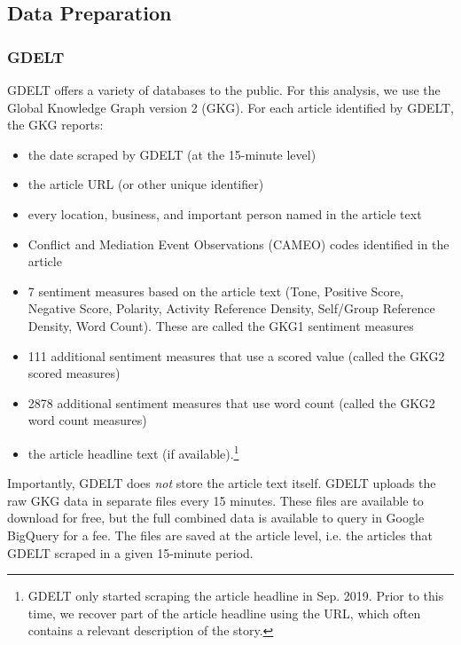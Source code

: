 \documentclass[12pt]{article}
\begin{document}
\subsection{Data Preparation}
\subsubsection{GDELT}
GDELT offers a variety of databases to the public. For this analysis, we use the Global Knowledge Graph version 2 (GKG). For each article identified by GDELT, the GKG reports:
\begin{itemize}
\singlespacing
    \item the date scraped by GDELT (at the 15-minute level)
    \item the article URL (or other unique identifier)
    \item every location, business, and important person named in the article text
    \item Conflict and Mediation Event Observations (CAMEO) codes identified in the article
    \item 7 sentiment measures based on the article text (Tone, Positive Score, Negative Score, Polarity, Activity Reference Density, Self/Group Reference Density, Word Count). These are called the GKG1 sentiment measures
    \item 111 additional sentiment measures that use a scored value (called the GKG2 scored measures)
    \item 2878 additional sentiment measures that use word count (called the GKG2 word count measures)
    \item the article headline text (if available).\footnote{GDELT only started scraping the article headline in Sep. 2019. Prior to this time, we recover part of the article headline using the URL, which often contains a relevant description of the story.}
\end{itemize}
Importantly, GDELT does \textit{not} store the article text itself. GDELT uploads the raw GKG data in separate files every 15 minutes. These files are available to download for free, but the full combined data is available to query in Google BigQuery for a fee. The files are saved at the article level, i.e. the articles that GDELT scraped in a given 15-minute period.
\end{document}
